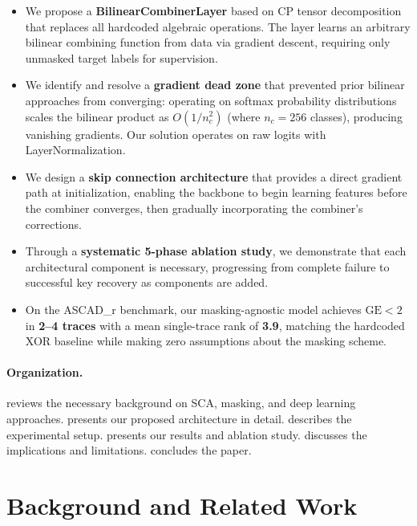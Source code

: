 \documentclass[submission]{iacrtrans}
\newcommand{\GE}{\mathrm{GE}}
\begin{document}
\begin{itemize}[leftmargin=*]
  \item We propose a \textbf{BilinearCombinerLayer} based on CP tensor decomposition that replaces all hardcoded algebraic operations. The layer learns an arbitrary bilinear combining function from data via gradient descent, requiring only unmasked target labels for supervision.

  \item We identify and resolve a \textbf{gradient dead zone} that prevented prior bilinear approaches from converging: operating on softmax probability distributions scales the bilinear product as $O(1/n_c^2)$ (where $n_c = 256$ classes), producing vanishing gradients. Our solution operates on raw logits with LayerNormalization.

  \item We design a \textbf{skip connection architecture} that provides a direct gradient path at initialization, enabling the backbone to begin learning features before the combiner converges, then gradually incorporating the combiner's corrections.

  \item Through a \textbf{systematic 5-phase ablation study}, we demonstrate that each architectural component is necessary, progressing from complete failure to successful key recovery as components are added.

  \item On the ASCAD\_r benchmark, our masking-agnostic model achieves $\GE < 2$ in \textbf{2--4 traces} with a mean single-trace rank of \textbf{3.9}, matching the hardcoded XOR baseline while making zero assumptions about the masking scheme.
\end{itemize}

\paragraph{Organization.}  reviews the necessary background on SCA, masking, and deep learning approaches.  presents our proposed architecture in detail.  describes the experimental setup.  presents our results and ablation study.  discusses the implications and limitations.  concludes the paper.


\section{Background and Related Work}\label{sec:background}
\end{document}
